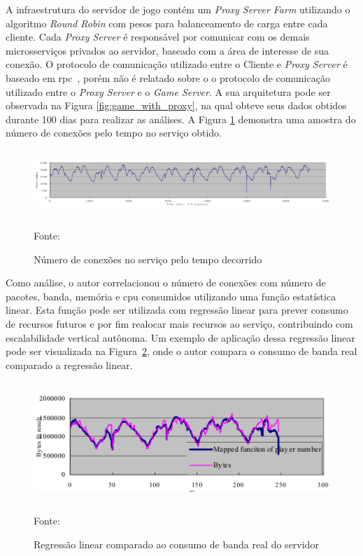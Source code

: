A infraestrutura do servidor de jogo contém um \textit{Proxy Server Farm} utilizando o algoritmo \textit{Round Robin} com pesos para balanceamento de carga entre cada cliente.
%
Cada \textit{Proxy Server} é responsável por comunicar com os demais microsserviços privados ao servidor, baseado com a área de interesse de sua conexão.
%
O protocolo de comunicação utilizado entre o Cliente e \textit{Proxy Server} é baseado em \ac{rpc}~\cite{faber, borella}, porém não é relatado sobre o o protocolo de comunicação utilizado entre o \textit{Proxy Server} e o \textit{Game Server}.
%
A sua arquitetura pode ser observada na Figura \ref{fig:game_with_proxy}, na qual obteve seus dados obtidos durante 100 dias para realizar as análises.
%
A Figura \ref{fig:players_peer_time} demonstra uma amostra do número de conexões pelo tempo no serviço obtido.



\begin{figure}[htb!]
\caption{Número de conexões no serviço pelo tempo decorrido}
\label{fig:players_peer_time}
\includegraphics[height=2.5cm]{img/cap2/players_peer_time.png}
\centering

Fonte:~\cite{1417630}
\end{figure}



Como análise, o autor correlacionou o número de conexões com número de pacotes, banda, memória e \ac{cpu} consumidos utilizando uma função estatística linear.
%
Esta função pode ser utilizada com regressão linear para prever consumo de recursos futuros e por fim realocar mais recursos ao serviço, contribuindo com escalabilidade vertical autônoma.
%
Um exemplo de aplicação dessa regressão linear pode ser visualizada na Figura~\ref{fig:regressao_bytes}, onde o autor compara o consumo de banda real comparado a regressão linear.


\begin{figure}[htb!]
\caption{Regressão linear comparado ao consumo de banda real do servidor}
\label{fig:regressao_bytes}
\includegraphics[height=4.5cm]{img/cap2/regressao.png}
\centering

Fonte:~\cite{1417630}
\end{figure}


